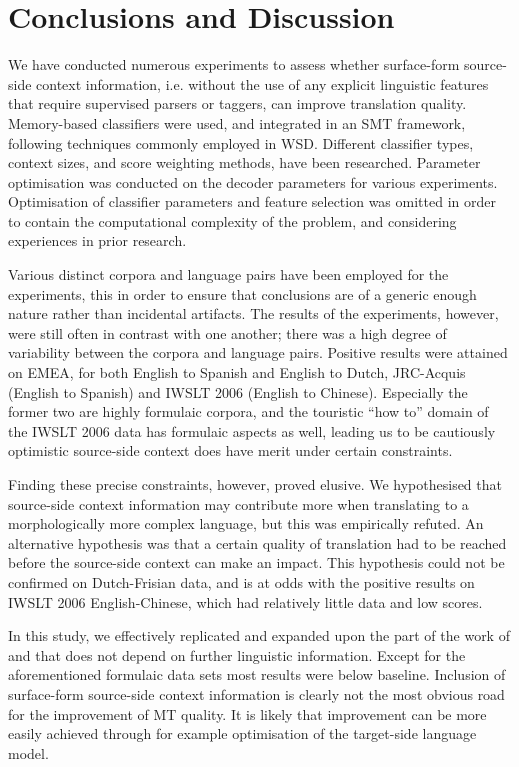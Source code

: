 \documentclass[smallextended]{svjour3}       %
\theoremstyle{break}
\begin{document}
\section{Conclusions and Discussion} 

We have conducted numerous experiments to assess whether surface-form
source-side context information, i.e. without the use of any explicit
linguistic features that require supervised parsers or taggers, can improve
translation quality. Memory-based classifiers were used, and integrated in an
SMT framework, following techniques commonly employed in WSD. Different
classifier types, context sizes, and score weighting methods, have been
researched. Parameter optimisation was conducted on the decoder parameters for
various experiments. Optimisation of classifier parameters and feature
selection was omitted in order to contain the computational complexity of the
problem, and considering experiences in prior research.

Various distinct corpora and language pairs have been employed for the
experiments, this in order to ensure that conclusions are of a generic
enough nature rather than incidental artifacts. The results of the
experiments, however, were still often in contrast with one another;
there was a high degree of variability between the corpora and
language pairs. Positive results were attained on EMEA, for both
English to Spanish and English to Dutch, JRC-Acquis (English to
Spanish) and IWSLT 2006 (English to Chinese).  Especially the former
two are highly formulaic corpora, and the touristic ``how to'' domain of
the IWSLT 2006 data has formulaic aspects as well, leading us to be
cautiously optimistic source-side context does have merit under
certain constraints.

Finding these precise constraints, however, proved elusive. We hypothesised that
source-side context information may contribute more when translating to a
morphologically more complex language, but this was empirically refuted.
An alternative hypothesis was that a certain quality of translation had to
be reached before the source-side context can make an impact. This hypothesis
could not be confirmed on Dutch-Frisian data, and is at odds with the positive
results on IWSLT 2006 English-Chinese, which had relatively little data and low
scores.

In this study, we effectively replicated and expanded upon the part of the work
of \cite{Stroppa+07} and \cite{Rejwanul+11} that does not depend on further
linguistic information. Except for the aforementioned formulaic data sets most
results were below baseline. Inclusion of surface-form source-side context
information is clearly not the most obvious road for the improvement of MT
quality. It is likely that improvement can be more easily achieved through for
example optimisation of the target-side language model.
\end{document}
